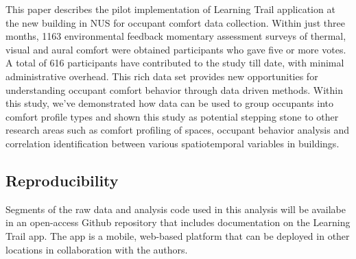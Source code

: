 
This paper describes the pilot implementation of Learning Trail application at the new building in NUS for occupant comfort data collection. Within just three months, 1163 environmental feedback momentary assessment surveys of thermal, visual and aural comfort were obtained participants who gave five or more votes. A total of 616 participants have contributed to the study till date, with minimal administrative overhead. This rich data set provides new opportunities for understanding occupant comfort behavior through data driven methods. Within this study, we've demonstrated how data can be used to group occupants into comfort profile types and shown this study as potential stepping stone to other research areas such as comfort profiling of spaces, occupant behavior analysis and correlation identification between various spatiotemporal variables in buildings. 


\subsection{Reproducibility}
Segments of the raw data and analysis code used in this analysis will be availabe in an open-access Github repository that includes documentation on the Learning Trail app. The app is a mobile, web-based platform that can be deployed in other locations in collaboration with the authors.


